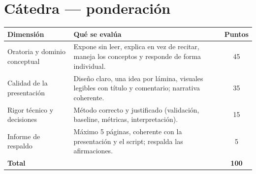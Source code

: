 \documentclass[11pt,letterpaper]{article}
\begin{document}
\section*{Cátedra --- ponderación}
\begin{center}\small
\begin{tabular}{p{4.9cm} p{8.2cm} c}
\toprule
Dimensión & Qué se evalúa & Puntos \\
\midrule
Oratoria y dominio conceptual & Expone sin leer, explica en vez de recitar, maneja los conceptos y responde de forma individual. & 45 \\
Calidad de la presentación & Diseño claro, una idea por lámina, visuales legibles con título y comentario; narrativa coherente. & 35 \\
Rigor técnico y decisiones & Método correcto y justificado (validación, baseline, métricas, interpretación). & 15 \\
Informe de respaldo & Máximo 5 páginas, coherente con la presentación y el script; respalda las afirmaciones. & 5 \\
\midrule
\textbf{Total} & & \textbf{100} \\
\bottomrule
\end{tabular}\end{center}
\end{document}

